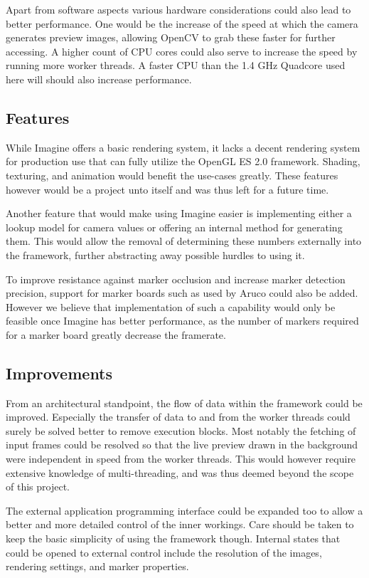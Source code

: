 Apart from software aspects various hardware considerations could also lead to better performance.
One would be the increase of the speed at which the camera generates preview images, allowing OpenCV to grab these faster for further accessing.
A higher count of CPU cores could also serve to increase the speed by running more worker threads.
A faster CPU than the 1.4 GHz Quadcore used here will should also increase performance.

\subsection{Features}

While Imagine offers a basic rendering system, it lacks a decent rendering system for production use that can fully utilize the OpenGL ES 2.0 framework.
Shading, texturing, and animation would benefit the use-cases greatly.
These features however would be a project unto itself and was thus left for a future time.

Another feature that would make using Imagine easier is implementing either a lookup model for camera values or offering an internal method for generating them.
This would allow the removal of determining these numbers externally into the framework, further abstracting away possible hurdles to using it.

To improve resistance against marker occlusion and increase marker detection precision, support for marker boards such as used by Aruco could also be added.
However we believe that implementation of such a capability would only be feasible once Imagine has better performance, as the number of markers required for a marker board greatly decrease the framerate.

\subsection{Improvements}
\label{improvements}

From an architectural standpoint, the flow of data within the framework could be improved.
Especially the transfer of data to and from the worker threads could surely be solved better to remove execution blocks.
Most notably the fetching of input frames could be resolved so that the live preview drawn in the background were independent in speed from the worker threads.
This would however require extensive knowledge of multi-threading, and was thus deemed beyond the scope of this project.

The external application programming interface could be expanded too to allow a better and more detailed control of the inner workings.
Care should be taken to keep the basic simplicity of using the framework though.
Internal states that could be opened to external control include the resolution of the images, rendering settings, and marker properties.

